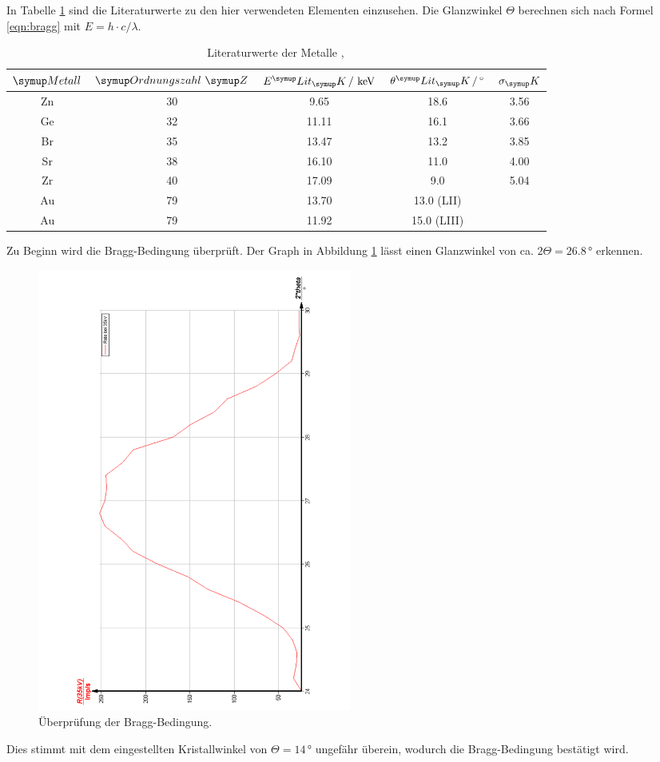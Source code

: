 In Tabelle \ref{tab:info} sind die Literaturwerte zu den hier verwendeten
Elementen einzusehen. Die Glanzwinkel $\Theta$ berechnen sich nach Formel
\eqref{eqn:bragg} mit $E=h\cdot c / \lambda$.
\begin{table}[h]
  \centering
  \begin{tabular}{c c c c c}
    \toprule
    $\su{Metall}$  & $\su{Ordnungszahl} \,\, \su{Z}$ &
    $E^\su{Lit}_\su{K} \,/\, \keV$ & $\theta^\su{Lit}_\su{K}\,/\,\si{\degree}$ & $\sigma_\su{K}$ \\
    \midrule
     Zn & 30 & 9.65 & 18.6 & 3.56 \\
     Ge & 32 & 11.11 & 16.1 & 3.66 \\
     Br & 35 & 13.47 & 13.2 & 3.85 \\
     Sr & 38 & 16.10 & 11.0 & 4.00 \\
     Zr & 40 & 17.09 & 9.0 &  5.04 \\
     Au & 79 & 13.70 & 13.0 (LII) &  \hrulefill\\
     Au & 79 & 11.92 & 15.0 (LIII) & \hrulefill \\
    \bottomrule
  \end{tabular}
  \caption{Literaturwerte der Metalle \cite{Elit},\,\cite{KAu}}
  \label{tab:info}
\end{table}
Zu Beginn wird die Bragg-Bedingung überprüft. Der Graph in Abbildung \ref{fig:Bragg3}
lässt einen Glanzwinkel von ca. $2\Theta = 26.8 \,\si{\degree}$ erkennen.
\begin{figure}
  \centering
  \includegraphics[width=0.5\textwidth, angle=270]{bilder/Bragg3.pdf}
  \caption{Überprüfung der Bragg-Bedingung.}
  \label{fig:Bragg3}
\end{figure}
Dies stimmt mit
dem eingestellten Kristallwinkel von $\Theta = 14\,\si{\degree}$ ungefähr überein,
wodurch die Bragg-Bedingung bestätigt wird.

